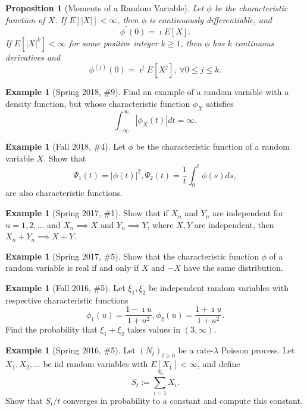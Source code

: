 \documentclass[12pt,reqno]{article}
\theoremstyle{plain}
\newtheorem{prop}[theorem]{Proposition}
\theoremstyle{definition}
\newtheorem{example}[theorem]{Example}
\begin{document}
\begin{prop}[Moments of a Random Variable] 
Let $\phi$ be the characteristic function of $X$. If $E[|X|] < \infty$, then 
$\phi$ is continuously differentiable, and 
\[
\phi^{\prime}(0) = \imath E[X]. 
\]
If $E[|X|^k] < \infty$ for some positive integer $k \geq 1$, then $\phi$ has 
$k$ continuous derivatives and 
\[
\phi^{(j)}(0) = \imath^j E[X^j],\ \forall 0 \leq j \leq k. 
\]
\end{prop} 

\begin{example}[Spring 2018, \#9]
Find an example of a random variable with a density function, but whose 
characteristic function $\phi_X$ satisfies 
\[
\int_{-\infty}^{\infty} |\phi_X(t)| dt = \infty. 
\]
\end{example} 

\begin{example}[Fall 2018, \#4]
Let $\phi$ be the characteristic function of a random variable $X$. 
Show that 
\[
\Psi_1(t) = |\phi(t)|^2, \Psi_2(t) = \frac{1}{t} \int_0^t \phi(s) ds, 
\]
are also characteristic functions. 
\end{example} 

\begin{example}[Spring 2017, \#1]
Show that if $X_n$ and $Y_n$ are independent for $n = 1,2,\ldots$ and 
$X_n \implies X$ and $Y_n \implies Y$, where $X,Y$ are independent, then 
$X_n+Y_n \implies X+Y$. 
\end{example} 

\begin{example}[Spring 2017, \#5]
Show that the characteristic function $\phi$ of a random variable is 
real if and only if $X$ and $-X$ have the same distribution. 
\end{example} 

\begin{example}[Fall 2016, \#5]
Let $\xi_1,\xi_2$ be independent random variables with respective 
characteristic functions 
\[
\phi_1(u) = \frac{1-\imath u}{1+u^2}, \phi_2(u) = \frac{1+\imath u}{1+u^2}. 
\]
Find the probability that $\xi_1+\xi_2$ takes values in $(3, \infty)$. 
\end{example} 

\begin{example}[Spring 2016, \#5]
Let $(N_t)_{t \geq 0}$ be a rate-$\lambda$ Poisson process. Let 
$X_1,X_2,\ldots$ be iid random variables with $E[X_1] < \infty$, and 
define 
\[
S_t := \sum_{i=1}^{N_t} X_i. 
\]
Show that $S_t / t$ converges in probability to a constant and 
compute this constant. 
\end{example} 
\end{document}
